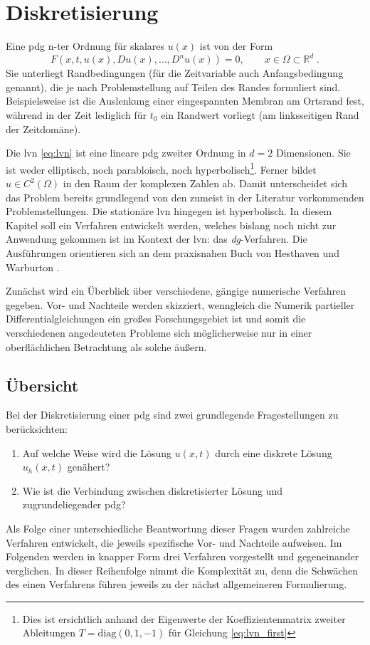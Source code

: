 \chapter{Diskretisierung}

Eine \ac{pdg} n-ter Ordnung für skalares $u(x)$ ist von der Form
\begin{equation}
  F(x, t, u(x), Du(x), \dots, D^nu(x))=0, \qquad x\in\Omega\subset\mathbb{R}^d \; .
\end{equation}
Sie unterliegt Randbedingungen (für die Zeitvariable auch Anfangsbedingung genannt), die je nach Problemstellung auf Teilen des Randes formuliert sind. Beispielsweise ist die Auslenkung einer eingespannten Membran am Ortsrand fest, während in der Zeit lediglich für $t_0$ ein Randwert vorliegt (am linksseitigen Rand der Zeitdomäne).

Die \ac{lvn} \eqref{eq:lvn} ist eine lineare \ac{pdg} zweiter Ordnung in $d=2$ Dimensionen. Sie ist weder elliptisch, noch parabloisch, noch hyperbolisch\footnote{Dies ist ersichtlich anhand der Eigenwerte der Koeffizientenmatrix zweiter Ableitungen $T=\text{diag}(0,1,-1)$ für Gleichung \eqref{eq:lvn_first}}.
Ferner bildet $u\in C^2(\Omega)$ in den Raum der komplexen Zahlen ab. Damit unterscheidet sich das Problem bereits grundlegend von den zumeist in der Literatur vorkommenden Problemstellungen. Die stationäre \ac{lvn} hingegen ist hyperbolisch. In diesem Kapitel soll ein Verfahren entwickelt werden, welches bislang noch nicht zur Anwendung gekommen ist im Kontext der \ac{lvn}: das \emph{\ac{dg}}-Verfahren. Die Ausführungen orientieren sich an dem praxisnahen Buch von Hesthaven und Warburton \cite{buch}.

Zunächst wird ein Überblick über verschiedene, gängige numerische Verfahren gegeben. Vor- und Nachteile werden skizziert, wenngleich die Numerik partieller Differentialgleichungen ein großes Forschungsgebiet ist und somit die verschiedenen angedeuteten Probleme sich möglicherweise nur in einer oberflächlichen Betrachtung als solche äußern.

\section{Übersicht}\label{sec:Übersicht}
Bei der Diskretisierung einer \ac{pdg} sind zwei grundlegende Fragestellungen zu berücksichten:
\begin{enumerate}
  \item Auf welche Weise wird die Lösung $u(x,t)$ durch eine diskrete Lösung $u_h(x,t)$ genähert?
  \item Wie ist die Verbindung zwischen diskretisierter Lösung und zugrundeliegender \ac{pdg}?
\end{enumerate}
Als Folge einer unterschiedliche Beantwortung dieser Fragen wurden zahlreiche Verfahren entwickelt, die jeweils spezifische Vor- und Nachteile aufweisen. Im Folgenden werden in knapper Form drei Verfahren vorgestellt und  gegeneinander verglichen. In dieser Reihenfolge nimmt die Komplexität zu, denn die Schwächen des einen Verfahrens führen jeweils zu der nächst allgemeineren Formulierung.

